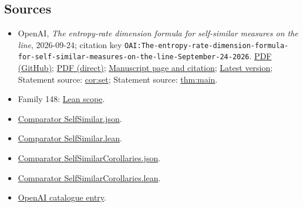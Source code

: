\documentclass[11pt]{article}
\begin{document}
\subsection{Sources}
\begin{itemize}
\item OpenAI, \emph{The entropy-rate dimension formula for self-similar measures on the line}, 2026-09-24; citation key \texttt{OAI:The-entropy-rate-dimension-formula-for-self-similar-measures-on-the-line-September-24-2026}. \href{https://github.com/openai/math/blob/adc7f1241b42e322a6451854ab7e4b4c146bf78a/preprints/The-entropy-rate-dimension-formula-for-self-similar-measures-on-the-line-September-24-2026/main.pdf}{PDF (GitHub)}; \href{https://github.com/openai/math/raw/adc7f1241b42e322a6451854ab7e4b4c146bf78a/preprints/The-entropy-rate-dimension-formula-for-self-similar-measures-on-the-line-September-24-2026/main.pdf}{PDF (direct)}; \href{https://github.com/openai/math/blob/adc7f1241b42e322a6451854ab7e4b4c146bf78a/preprints/The-entropy-rate-dimension-formula-for-self-similar-measures-on-the-line-September-24-2026/README.md}{Manuscript page and citation}; \href{https://github.com/openai/math/blob/main/preprints/The-entropy-rate-dimension-formula-for-self-similar-measures-on-the-line-September-24-2026/main.pdf}{Latest version}; Statement source: \href{https://github.com/openai/math/blob/adc7f1241b42e322a6451854ab7e4b4c146bf78a/preprints/The-entropy-rate-dimension-formula-for-self-similar-measures-on-the-line-September-24-2026/build/sections/corollaries.tex\#L52}{cor:set}; Statement source: \href{https://github.com/openai/math/blob/adc7f1241b42e322a6451854ab7e4b4c146bf78a/preprints/The-entropy-rate-dimension-formula-for-self-similar-measures-on-the-line-September-24-2026/build/sections/introduction.tex\#L78}{thm:main}.
\item Family 148: \href{https://github.com/openai/math/blob/adc7f1241b42e322a6451854ab7e4b4c146bf78a/lean/docs/148.md}{Lean scope}.
\item \href{https://github.com/openai/math/blob/adc7f1241b42e322a6451854ab7e4b4c146bf78a/lean/ComparatorChallenges/SelfSimilar.json}{Comparator SelfSimilar.json}.
\item \href{https://github.com/openai/math/blob/adc7f1241b42e322a6451854ab7e4b4c146bf78a/lean/ComparatorChallenges/SelfSimilar.lean}{Comparator SelfSimilar.lean}.
\item \href{https://github.com/openai/math/blob/adc7f1241b42e322a6451854ab7e4b4c146bf78a/lean/ComparatorChallenges/SelfSimilarCorollaries.json}{Comparator SelfSimilarCorollaries.json}.
\item \href{https://github.com/openai/math/blob/adc7f1241b42e322a6451854ab7e4b4c146bf78a/lean/ComparatorChallenges/SelfSimilarCorollaries.lean}{Comparator SelfSimilarCorollaries.lean}.
\item \href{https://github.com/openai/math/blob/adc7f1241b42e322a6451854ab7e4b4c146bf78a/CONTENTS.md}{OpenAI catalogue entry}.
\end{itemize}
\end{document}
